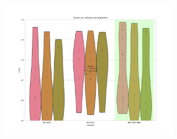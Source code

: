 \begin{figure}
    \centering
    \begin{subfigure}[t]{\textwidth}
        \centering
        \includegraphics[width=\textwidth]{CrossSubjectEvaluation_/scores.pdf}
    \end{subfigure}%
     

\end{figure}
